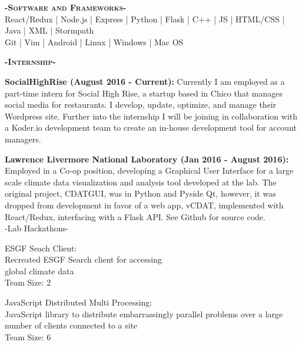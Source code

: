 \documentclass[12pt]{article}
\begin{document}
\center
\color{black}
\textbf{\textsc{-Software and Frameworks-}}\\
\medskip
\color{Cerulean}React/Redux | Node.js  | Express | Python | Flask  | C++ | JS | HTML/CSS | Java | XML | Stormpath\color{gray}\\
\smallskip
Git | Vim | Android | Linux | Windows | Mac OS\\
\color{black}
\begin{center}
\textbf{\textsc{-Internship-}}\\
\end{center}
\begin{footnotesize}

\flushleft
\color{Cerulean}\textbf{SocialHighRise (August 2016 - Current):}
\color{black}Currently I am employed as a part-time intern for Social High Rise, a startup based in Chico that manages social media for restaurants. I develop, update, optimize, and manage their Wordpress site. Further into the internship I will be joining in collaboration with a \color{TealBlue}Koder.io \color{black} development team to create an in-house development tool for account managers.
\medskip

\color{Cerulean}\textbf{Lawrence Livermore National Laboratory (Jan 2016 - August 2016):} 
\color{Black}Employed in a Co-op position, developing a Graphical User Interface for a large scale climate data visualization and analysis tool developed at the lab. The original project, CDATGUI, was in \color{TealBlue}Python and Pyside Qt, \color{Black} however, it was dropped from development in favor of a web app, vCDAT, implemented with \color{TealBlue}React/Redux\color{Black}, interfacing with a \color{TealBlue}Flask \color{Black}API. See Github for source code.\\

\center
-Lab Hackathons-
\begin{multicols}{2}
\center
\color{Cerulean}ESGF Seach Client:\\ \color{black}
Recreated ESGF Search client for accessing\\
global climate data\\
Team Size: 2

\columnbreak

\color{Cerulean}JavaScript Distributed Multi Processing:\\ \color{black}
JavaScript library to distribute embarrassingly parallel problems over a large number of clients connected to a site\\
Team Size: 6


\end{multicols}
\medskip

\end{footnotesize}
\end{document}
